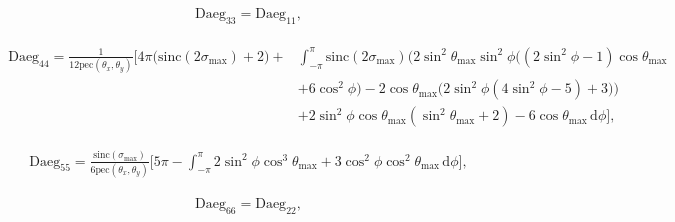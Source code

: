 \documentclass[a4paper,11pt,twoside,openright]{book}
\providecommand{\pec}{{\mathrm{pec}}}%
\providecommand{\sinc}{{\mathrm{sinc}}}%
\def\lthtmlcheckvsize{\ifdim\ht\sizebox<\vsize 
  \ifdim\wd\sizebox<\hsize\expandafter\hfill\fi \expandafter\vfill
  \else\expandafter\vss\fi}%
\begin{document}
{\newpage\clearpage
\setcounter{equation}{52}
%
\begin{subequations}\begin{flalign}
&\textrm{Daeg}_{33} = \textrm{Daeg}_{11} , &
\end{flalign}\end{subequations}%
\lthtmldisplayZ
\lthtmlcheckvsize\clearpage}

{\newpage\clearpage
\setcounter{equation}{52}
%
\begin{subequations}\begin{flalign}
\begin{split}
\textrm{Daeg}_{44} = \frac{1}{12\pec (\theta_x , \theta_y )} \Bigg[
4\pi \big( \sinc (2\sigma_{\textrm{max}}) + 2 \big) + &
\int_{-\pi}^{\pi}
\sinc (2\sigma_{\textrm{max}}) \bigg( 2\sin^2\theta_{\textrm{max}}\sin^2\phi \Big( \left( 2\sin^2\phi - 1 \right) \cos\theta_{\textrm{max}}\\
& + 6\cos^2\phi \Big) - 2\cos\theta_{\textrm{max}}\Big( 2\sin^2\phi \left( 4\sin^2\phi - 5 \right) + 3 \Big) \bigg) \\
& + 2\sin^2\phi \cos\theta_{\textrm{max}}\left( \sin^2\theta_{\textrm{max}}+ 2 \right) - 6\cos\theta_{\textrm{max}}
\,\mathrm{d}\phi
\Bigg] ,
\end{split} &
\end{flalign}\end{subequations}%
\lthtmldisplayZ
\lthtmlcheckvsize\clearpage}

{\newpage\clearpage
\setcounter{equation}{52}
%
\begin{subequations}\begin{flalign}
&\textrm{Daeg}_{55} = \frac{\sinc (\sigma_{\textrm{max}})}{6\pec (\theta_x , \theta_y )} \Bigg[
5\pi -
\int_{-\pi}^{\pi}
2\sin^2\phi \cos^3\theta_{\textrm{max}}+ 3\cos^2\phi \cos^2\theta_{\textrm{max}}
\,\mathrm{d}\phi
\Bigg] , &
\end{flalign}\end{subequations}%
\lthtmldisplayZ
\lthtmlcheckvsize\clearpage}

{\newpage\clearpage
\setcounter{equation}{52}
%
\begin{subequations}\begin{flalign}
&\textrm{Daeg}_{66} = \textrm{Daeg}_{22} , &
\end{flalign}\end{subequations}%
\lthtmldisplayZ
\lthtmlcheckvsize\clearpage}
\end{document}
